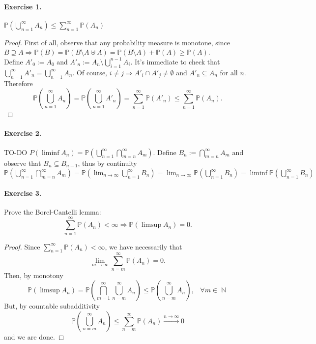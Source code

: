 \documentclass[12pt,a4paper]{report}
\theoremstyle{definition}
\theoremstyle{num.custom-title}
\DeclareMathOperator{\N}{\mathbb{N}}
\DeclareMathOperator{\imp}{\Rightarrow}
\DeclareMathOperator{\sm}{\setminus}
\DeclareMathOperator{\sse}{\subseteq}
\renewcommand{\P}{\mathbb{P}}
\renewcommand{\1}{\mathbbm{1}}
\begin{document}
\paragraph{Exercise 1.} $\P \left( \bigcup_{n=1}^\infty A_n \right) \le \sum_{n=1}^\infty \P(A_n)$
\begin{proof}
First of all, observe that any probability measure is monotone, since $B \supseteq A \imp \P(B)=\P(B \sm A \uplus A)=\P(B \sm A) + \P(A) \ge \P(A)$.\\
Define $A'_0:=A_0$ and $A'_n:=A_n \sm \bigcup_{i=1}^{n-1} A_i$. It's immediate to check that $\bigcup_{n=1}^\infty A'_n = \bigcup_{n=1}^\infty A_n$. Of course, $i \ne j \imp A'_i \cap A'_j \ne \emptyset$ and $A'_n \sse A_n$ for all $n$. Therefore
\[
\P \left( \bigcup_{n=1}^\infty A_n \right) = \P \left( \bigcup_{n=1}^\infty A'_n \right) = \sum_{n=1}^\infty \P(A'_n) \le \sum_{n=1}^\infty \P(A_n).
\]
\end{proof}

\paragraph{Exercise 2.}
TO-DO %
$P(\liminf A_n)=\P(\bigcup_{n=1}^\infty \bigcap_{m=n}^\infty A_m)$. Define $B_n := \bigcap_{m=n}^\infty A_m$ and observe that $B_n \sse B_{n+1}$, thus by continuity $\P(\bigcup_{n=1}^\infty \bigcap_{m=n}^\infty A_m)=\P(\lim_{n \to \infty} \bigcup_{n=1}^\infty B_n) = \lim_{n \to \infty} \P(\bigcup_{n=1}^\infty B_n) = \liminf \P(\bigcup_{n=1}^\infty B_n)$

\paragraph{Exercise 3.} Prove the Borel-Cantelli lemma:
\[
\sum_{n=1}^\infty \P(A_n)<\infty \imp \P(\limsup A_n)=0.
\]
\begin{proof}
Since $\sum_{n=1}^\infty \P(A_n)<\infty$, we have necessarily that 
\[
\lim_{m \to \infty} \sum_{n=m}^\infty \P(A_n)=0. 
\]
Then, by monotony
\[
\P(\limsup A_n) = \P \left( \bigcap_{m=1}^\infty \bigcup_{n=m}^\infty A_n \right) \le \P \left( \bigcup_{n=m}^\infty A_n \right), \; \; \; \forall m \in \N
\]
But, by countable subadditivity
\[
\P \left( \bigcup_{n=m}^\infty A_n \right) \le \sum_{n=m}^\infty \P(A_n) \stackrel{n \to \infty}{\longrightarrow} 0
\]
and we are done.
\end{proof}
\end{document}
